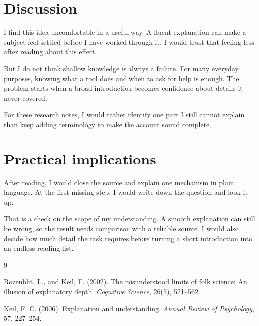 \documentclass[11pt,a4paper]{article}
\begin{document}
\section{Discussion}

I find this idea uncomfortable in a useful way. A fluent explanation can
make a subject feel settled before I have worked through it. I would trust
that feeling less after reading about this effect.

But I do not think shallow knowledge is always a failure. For many everyday
purposes, knowing what a tool does and when to ask for help is enough.
The problem starts when a broad introduction becomes confidence about
details it never covered.

For these research notes, I would rather identify one part I still cannot
explain than keep adding terminology to make the account sound complete.

\section{Practical implications}

After reading, I would close the source and explain one mechanism in plain
language. At the first missing step, I would write down the question and
look it up.

That is a check on the scope of my understanding. A smooth explanation can
still be wrong, so the result needs comparison with a reliable source.
I would also decide how much detail the task requires before turning a
short introduction into an endless reading list.

\renewcommand{\refname}{References}
\begin{thebibliography}{9}
\small
\setlength{\itemsep}{0.35em}

Rozenblit, L., and Keil, F. (2002).
\href{https://cogdevlab.yale.edu/sites/default/files/files/rozenblit%20%26%20keil%20%202002.pdf}
{The misunderstood limits of folk science: An illusion of explanatory depth.}
\textit{Cognitive Science}, 26(5), 521--562.

Keil, F. C. (2006).
\href{https://doi.org/10.1146/annurev.psych.57.102904.190100}
{Explanation and understanding.}
\textit{Annual Review of Psychology}, 57, 227--254.

\end{thebibliography}
\end{document}
